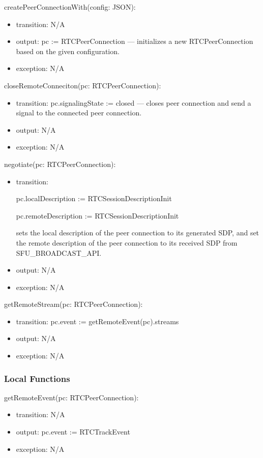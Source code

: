 \documentclass[12pt, titlepage]{article}
\begin{document}
\noindent createPeerConnectionWith(config: JSON):
\begin{itemize}
\item transition: N/A
\item output: pc := RTCPeerConnection --- initializes a new RTCPeerConnection based
  on the given configuration.
\item exception: N/A
\end{itemize}


\noindent closeRemoteConneciton(pc: RTCPeerConnection):
\begin{itemize}
\item transition: pc.signalingState := closed --- closes peer connection and send a
  signal to the connected peer connection.
\item output: N/A
\item exception: N/A
\end{itemize}


\noindent negotiate(pc: RTCPeerConnection):
\begin{itemize}
\item transition:

  pc.localDescription := RTCSessionDescriptionInit

  pc.remoteDescription := RTCSessionDescriptionInit

  sets the local description of the peer connection to its generated SDP, and
  set the remote description of the peer connection to its received SDP from
  SFU\_BROADCAST\_API.
\item output: N/A
\item exception: N/A
\end{itemize}


\noindent getRemoteStream(pc: RTCPeerConnection):
\begin{itemize}
\item transition: pc.event := getRemoteEvent(pc).streams
\item output: N/A
\item exception: N/A
\end{itemize}

\subsubsection{Local Functions}

\noindent getRemoteEvent(pc: RTCPeerConnection):
\begin{itemize}
\item transition: N/A
\item output: pc.event := RTCTrackEvent
\item exception: N/A
\end{itemize}
\end{document}
